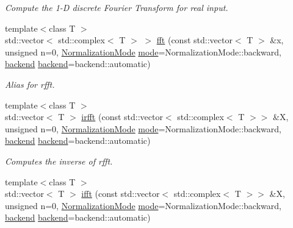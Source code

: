 \begin{DoxyCompactItemize}
\begin{DoxyCompactList}\small\item\em Compute the 1-\/D discrete Fourier Transform for real input. \end{DoxyCompactList}\item 
\mbox{\label{namespacedsp_1_1fft_ab15fe330f8a7a2d98f10ceeada2a7df5}} 
{\footnotesize template$<$class T $>$ }\\std\+::vector$<$ std\+::complex$<$ T $>$ $>$ \mbox{\hyperlink{namespacedsp_1_1fft_ab15fe330f8a7a2d98f10ceeada2a7df5}{fft}} (const std\+::vector$<$ T $>$ \&x, unsigned n=0, \mbox{\hyperlink{namespacedsp_1_1fft_aadeffdb34ec53320437b1c6dd1354915}{Normalization\+Mode}} \mbox{\hyperlink{namespacedsp_a1d4932cf0fd90a0ecde3b2deffeb740c}{mode}}=Normalization\+Mode\+::backward, \mbox{\hyperlink{namespacedsp_1_1fft_a4fef2564f82f5eb8ea2d5c9909fb2ba4}{backend}} \mbox{\hyperlink{namespacedsp_1_1fft_a4fef2564f82f5eb8ea2d5c9909fb2ba4}{backend}}=backend\+::automatic)
\begin{DoxyCompactList}\small\item\em Alias for rfft. \end{DoxyCompactList}\item 
{\footnotesize template$<$class T $>$ }\\std\+::vector$<$ T $>$ \mbox{\hyperlink{namespacedsp_1_1fft_a3b9c8542f82a31aa5745f9b885d8fdbc}{irfft}} (const std\+::vector$<$ std\+::complex$<$ T $>$$>$ \&X, unsigned n=0, \mbox{\hyperlink{namespacedsp_1_1fft_aadeffdb34ec53320437b1c6dd1354915}{Normalization\+Mode}} \mbox{\hyperlink{namespacedsp_a1d4932cf0fd90a0ecde3b2deffeb740c}{mode}}=Normalization\+Mode\+::backward, \mbox{\hyperlink{namespacedsp_1_1fft_a4fef2564f82f5eb8ea2d5c9909fb2ba4}{backend}} \mbox{\hyperlink{namespacedsp_1_1fft_a4fef2564f82f5eb8ea2d5c9909fb2ba4}{backend}}=backend\+::automatic)
\begin{DoxyCompactList}\small\item\em Computes the inverse of rfft. \end{DoxyCompactList}\item 
\mbox{\label{namespacedsp_1_1fft_a7ce897c0dfc4bedf80452b2a763769b1}} 
{\footnotesize template$<$class T $>$ }\\std\+::vector$<$ T $>$ \mbox{\hyperlink{namespacedsp_1_1fft_a7ce897c0dfc4bedf80452b2a763769b1}{ifft}} (const std\+::vector$<$ std\+::complex$<$ T $>$$>$ \&X, unsigned n=0, \mbox{\hyperlink{namespacedsp_1_1fft_aadeffdb34ec53320437b1c6dd1354915}{Normalization\+Mode}} \mbox{\hyperlink{namespacedsp_a1d4932cf0fd90a0ecde3b2deffeb740c}{mode}}=Normalization\+Mode\+::backward, \mbox{\hyperlink{namespacedsp_1_1fft_a4fef2564f82f5eb8ea2d5c9909fb2ba4}{backend}} \mbox{\hyperlink{namespacedsp_1_1fft_a4fef2564f82f5eb8ea2d5c9909fb2ba4}{backend}}=backend\+::automatic)

\end{DoxyCompactItemize}
